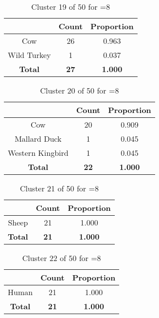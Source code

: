 \begin{table}[ht!]
\centering
\begin{tabular}{|c|c|c|}
\hline
\bf \Spec{} &\bf Count &\bf Proportion\\ \hline \hline
Cow & 26 & 0.963\\ \hline
Wild Turkey & 1 & 0.037\\ \hline
\hline
\bf Total & \bf 27 & \bf 1.000\\ \hline
\end{tabular}
\label{tab:cluster:19:8}
\caption{Cluster 19 of 50 for \minneigh{}=8}
\end{table}

\clearpage
\begin{table}[ht!]
\centering
\begin{tabular}{|c|c|c|}
\hline
\bf \Spec{} &\bf Count &\bf Proportion\\ \hline \hline
Cow & 20 & 0.909\\ \hline
Mallard Duck & 1 & 0.045\\ \hline
Western Kingbird & 1 & 0.045\\ \hline
\hline
\bf Total & \bf 22 & \bf 1.000\\ \hline
\end{tabular}
\label{tab:cluster:20:8}
\caption{Cluster 20 of 50 for \minneigh{}=8}
\end{table}

\begin{table}[ht!]
\centering
\begin{tabular}{|c|c|c|}
\hline
\bf \Spec{} &\bf Count &\bf Proportion\\ \hline \hline
Sheep & 21 & 1.000\\ \hline
\hline
\bf Total & \bf 21 & \bf 1.000\\ \hline
\end{tabular}
\label{tab:cluster:21:8}
\caption{Cluster 21 of 50 for \minneigh{}=8}
\end{table}

\begin{table}[ht!]
\centering
\begin{tabular}{|c|c|c|}
\hline
\bf \Spec{} &\bf Count &\bf Proportion\\ \hline \hline
Human & 21 & 1.000\\ \hline
\hline
\bf Total & \bf 21 & \bf 1.000\\ \hline
\end{tabular}
\label{tab:cluster:22:8}
\caption{Cluster 22 of 50 for \minneigh{}=8}
\end{table}

